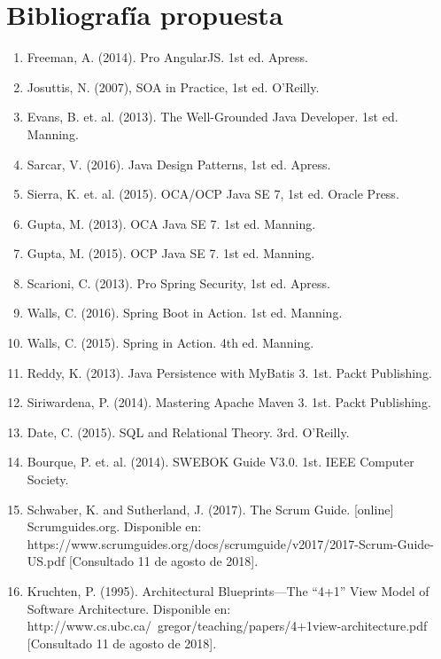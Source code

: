 \documentclass[letterpaper,11pt]{article}
\begin{document}
\section{Bibliografía propuesta}
\begin{enumerate}
\item Freeman, A. (2014). Pro AngularJS. 1st ed. Apress.
\item Josuttis, N. (2007), SOA in Practice, 1st ed. O’Reilly.
\item Evans, B. et. al. (2013). The Well-Grounded Java Developer. 1st ed. Manning.
\item Sarcar, V. (2016). Java Design Patterns, 1st ed. Apress.
\item Sierra, K. et. al. (2015). OCA/OCP Java SE 7, 1st ed. Oracle Press.
\item Gupta, M. (2013). OCA Java SE 7. 1st ed. Manning.
\item Gupta, M. (2015). OCP Java SE 7. 1st ed. Manning.
\item Scarioni, C. (2013). Pro Spring Security, 1st ed. Apress.
\item Walls, C. (2016). Spring Boot in Action. 1st ed. Manning.
\item Walls, C. (2015). Spring in Action. 4th ed. Manning.
\item Reddy, K. (2013). Java Persistence with MyBatis 3. 1st. Packt Publishing.
\item Siriwardena, P. (2014). Mastering Apache Maven 3. 1st. Packt Publishing.
\item Date, C. (2015). SQL and Relational Theory. 3rd. O’Reilly.
\item Bourque, P. et. al. (2014). SWEBOK Guide V3.0. 1st. IEEE Computer Society.
\item Schwaber, K. and Sutherland, J. (2017). The Scrum Guide. [online] Scrumguides.org. Disponible en:\\https://www.scrumguides.org/docs/scrumguide/v2017/2017-Scrum-Guide-US.pdf [Consultado 11  de agosto de 2018].
\item Kruchten, P. (1995). Architectural Blueprints—The “4+1” View Model of Software Architecture.  Disponible en: http://www.cs.ubc.ca/~gregor/teaching/papers/4+1view-architecture.pdf [Consultado 11 de agosto de 2018].
\end{enumerate}
 
\end{document}
